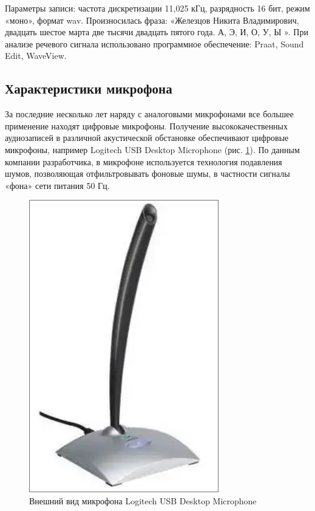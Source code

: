 
Параметры записи: частота дискретизации 11,025 кГц, разрядность 16 бит, режим
«моно», формат wav. Произносилась фраза: «Железцов Никита Владимирович,
двадцать шестое марта две тысячи двадцать пятого года. А, Э, И, О, У, Ы ». При
анализе речевого сигнала использовано программное обеспечение: Praat, Sound
Edit, WaveView.

\subsection*{Характеристики микрофона}

За последние несколько лет наряду с аналоговыми микрофонами все большее
применение находят цифровые микрофоны. Получение высококачественных
аудиозаписей в различной акустической обстановке обеспечивают цифровые
микрофоны, например Logitech USB Desktop Microphone (рис. \ref{fig:fig02}). По
данным компании разработчика, в микрофоне используется технология подавления
шумов, позволяющая отфильтровывать фоновые шумы, в частности сигналы «фона»
сети питания 50 Гц.

\begin{figure}
    \centering
    \includegraphics[scale=0.6]{inc/fig_02.png}
    \caption{ Внешний вид микрофона Logitech USB Desktop Microphone }
    \label{fig:fig02}
\end{figure}

